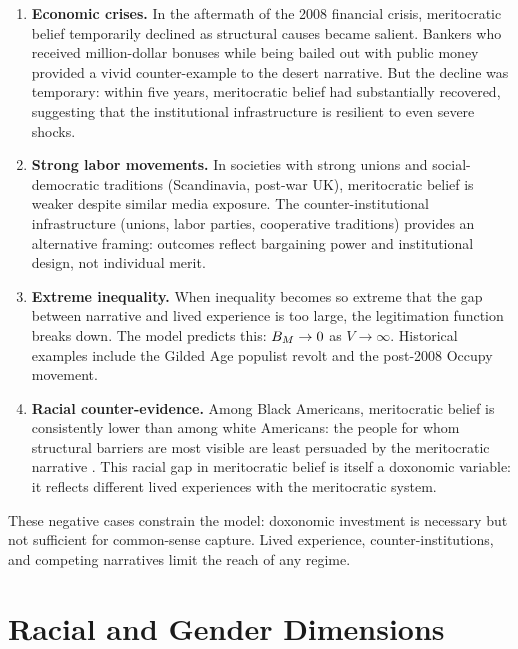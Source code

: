 \begin{enumerate}
  \item \textbf{Economic crises.}
  In the aftermath of the 2008 financial crisis, meritocratic belief temporarily declined as structural causes became salient.
  Bankers who received million-dollar bonuses while being bailed out with public money provided a vivid counter-example to the desert narrative.
  But the decline was temporary: within five years, meritocratic belief had substantially recovered, suggesting that the institutional infrastructure is resilient to even severe shocks.

  \item \textbf{Strong labor movements.}
  In societies with strong unions and social-democratic traditions (Scandinavia, post-war UK), meritocratic belief is weaker despite similar media exposure.
  The counter-institutional infrastructure (unions, labor parties, cooperative traditions) provides an alternative framing: outcomes reflect bargaining power and institutional design, not individual merit.

  \item \textbf{Extreme inequality.}
  When inequality becomes so extreme that the gap between narrative and lived experience is too large, the legitimation function breaks down.
  The model predicts this: $B_{M} \to 0$ as $V \to \infty$.
  Historical examples include the Gilded Age populist revolt and the post-2008 Occupy movement.

  \item \textbf{Racial counter-evidence.}
  Among Black Americans, meritocratic belief is consistently lower than among white Americans: the people for whom structural barriers are most visible are least persuaded by the meritocratic narrative \autocite{hochschild2016}.
  This racial gap in meritocratic belief is itself a doxonomic variable: it reflects different lived experiences with the meritocratic system.
\end{enumerate}

These negative cases constrain the model: doxonomic investment is necessary but not sufficient for common-sense capture.
Lived experience, counter-institutions, and competing narratives limit the reach of any regime.

\section{Racial and Gender Dimensions}
\label{sec:ch22-racial}

